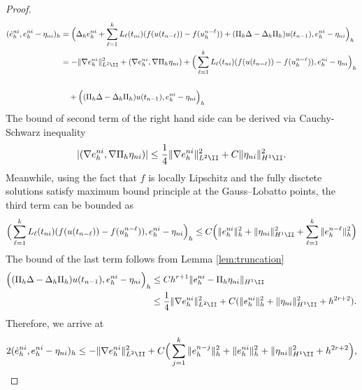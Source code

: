 \begin{proof}
\begin{equation*}
\begin{split}
(\dot{e}_h^{ni},e_h^{ni}-\eta_{ni})_h
&= \Big(   \Delta_h e_h^{ni} +   \sum_{\ell=1}^k L_{\ell}(t_{ni})   (f(u(t_{n-\ell})) - f(u_h^{n-\ell}))
+ (\Pi_h \Delta - \Delta_h \Pi_h) u(t_{n-1}), e_h^{ni}-\eta_{ni} \Big)_h\\
&= -\|\nabla e_h^{ni}\|_{L^2\II}^2 + (\nabla e_h^{ni} , \nabla \Pi_h \eta_{ni}) +  \Big(\sum_{\ell=1}^k L_{\ell}(t_{ni})   (f(u(t_{n-\ell})) - f(u_h^{n-\ell})), e_h^{ni}-\eta_{ni} \Big)_h  \\
& \quad \\
& \quad +  \Big(  (\Pi_h \Delta - \Delta_h \Pi_h) u(t_{n-1}), e_h^{ni}-\eta_{ni}\Big)_h
\end{split}
\end{equation*}
The bound of second term of the right hand side can be derived via Cauchy-Schwarz inequality
\begin{equation*}%
|(\nabla e_h^{ni} , \nabla \Pi_h \eta_{ni})| \le \frac14 \|  \nabla e_h^{ni} \|_{L^2\II}^2 + C \| \eta_{ni}\|_{H^1\II}^2.
\end{equation*}
Meanwhile, using the fact that $f$ is locally Lipschitz and the fully disctete solutions
satisfy maximum bound principle at the Gauss--Lobatto points, the third term can be bounded as
\begin{equation*}
\begin{split}
\Big(\sum_{\ell=1}^k L_{\ell}(t_{ni})   (f(u(t_{n-\ell})) - f(u_h^{n-\ell})), e_h^{ni}-\eta_{ni}\Big)_h
 \le C \Big( \|  e^{ni}_h \|_h^2 + \|\eta_{ni} \|_{H^1\II}^2 + \sum_{\ell=1}^k \| e_h^{n-\ell} \|_h^2 \Big)
\end{split}
\end{equation*}
The bound of the last term follows from Lemma \ref{lem:truncation}
\begin{equation*}%
\begin{split}
 \Big(  (\Pi_h \Delta - \Delta_h \Pi_h) u(t_{n-1}), e_h^{ni}- \eta_{ni} \Big)_h &\le C h^{r+1}  \| e_h^{ni}- \Pi_h  \eta_{ni}   \|_{H^1\II} \\
 &\le  \frac14\| \nabla e_h^{ni}  \|_{L^2\II}^2 + C(\|  e_h^{ni} \|_h^2 + \|  \eta_{ni} \|_{H^1\II}^2+ h^{2r+2} ).
\end{split}
\end{equation*}
Therefore, we arrive at
\begin{equation*}
2(\dot{e}_h^{ni},e_h^{ni}-\eta_{ni})_h \le  -\|\nabla e_h^{ni}\|_{L^2\II}^2 +
 C \Big(  \sum_{j=1}^k \| e_h^{n-j} \|_h^2 + \|  e_h^{ni} \|_h^2  + \| \eta_{ni}\|_{H^1\II}^2 + h^{2r+2} \Big),

\end{equation*}
\end{proof}
